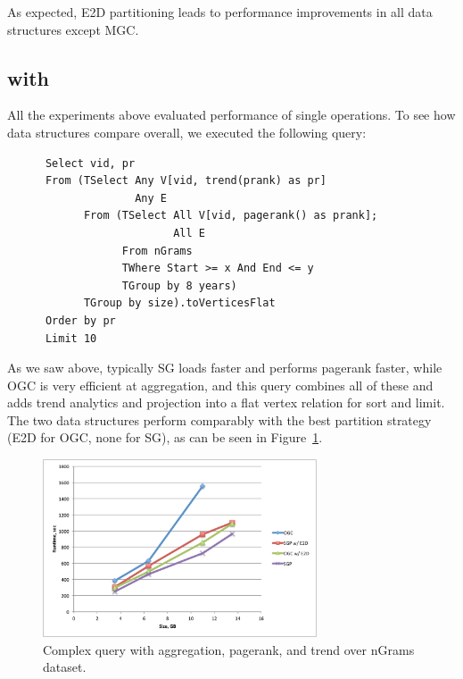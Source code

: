 As expected, E2D partitioning leads to performance improvements in all
data structures except MGC.

\subsection{ with }

All the experiments above evaluated performance of single operations.
To see how data structures compare overall, we executed the following
query:

\begin{small}
\begin{verbatim}
      Select vid, pr
      From (TSelect Any V[vid, trend(prank) as pr]
                    Any E
            From (TSelect All V[vid, pagerank() as prank]; 
                          All E
                  From nGrams
                  TWhere Start >= x And End <= y
                  TGroup by 8 years)
            TGroup by size).toVerticesFlat
      Order by pr
      Limit 10
\end{verbatim}
\end{small}

As we saw above, typically SG loads faster and performs pagerank
faster, while OGC is very efficient at aggregation, and this query
combines all of these and adds trend analytics and projection into a
flat vertex relation for sort and limit.  The two data structures
perform comparably with the best partition strategy (E2D for OGC, none
for SG), as can be seen in Figure~\ref{fig:complexq}.

\begin{figure}[t]
\includegraphics[width=3.2in]{figs/complexq.pdf}
\caption{Complex query with aggregation, pagerank, and trend over
  nGrams dataset.}
\label{fig:complexq}
\end{figure}

